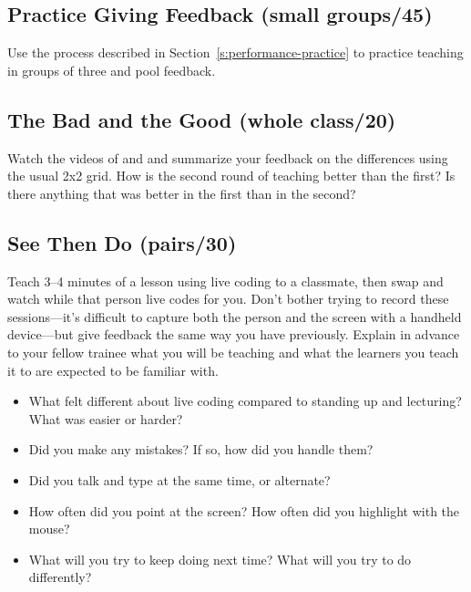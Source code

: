 \subsection*{Practice Giving Feedback (small groups/45)}

Use the process described in Section~\ref{s:performance-practice}
to practice teaching in groups of three
and pool feedback.

\subsection*{The Bad and the Good (whole class/20)}

Watch the videos of 
and 
and summarize your feedback on the differences using the usual 2x2 grid.
How is the second round of teaching better than the first?
Is there anything that was better in the first than in the second?

\subsection*{See Then Do (pairs/30)}

Teach 3--4 minutes of a lesson using live coding to a classmate,
then swap and watch while that person live codes for you.
Don't bother trying to record these sessions---it's difficult to capture
both the person and the screen with a handheld device---but
give feedback the same way you have previously.
Explain in advance to your fellow trainee what you will be teaching
and what the learners you teach it to are expected to be familiar with.

\begin{itemize}

\item
  What felt different about live coding compared to standing up and lecturing?
  What was easier or harder?

\item
  Did you make any mistakes?
  If so, how did you handle them?

\item
  Did you talk and type at the same time, or alternate?

\item
  How often did you point at the screen?
  How often did you highlight with the mouse?

\item
  What will you try to keep doing next time?
  What will you try to do differently?

\end{itemize}

